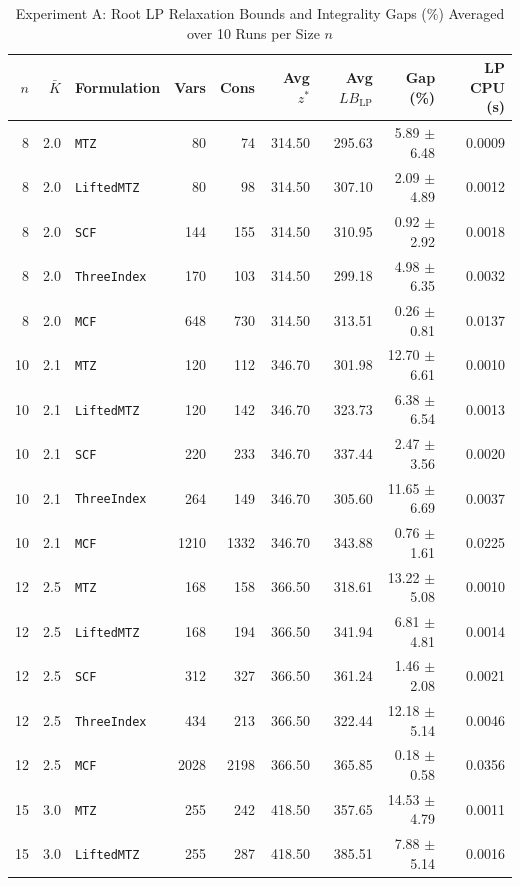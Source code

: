 \documentclass[11pt,a4paper]{article}
\begin{document}
\begin{table}[htbp]
\centering
\caption{Experiment A: Root LP Relaxation Bounds and Integrality Gaps (\%) Averaged over 10 Runs per Size $n$}
\label{tab:root_lp}
\footnotesize
\begin{tabular}{rrlrrrrrr}
\toprule
$n$ & $\bar{K}$ & Formulation & Vars & Cons & Avg $z^*$ & Avg $LB_{\text{LP}}$ & Gap (\%) & LP CPU (s) \\
\midrule
8 & 2.0 & \texttt{MTZ} & 80 & 74 & 314.50 & 295.63 & 5.89 $\pm$ 6.48 & 0.0009 \\
8 & 2.0 & \texttt{LiftedMTZ} & 80 & 98 & 314.50 & 307.10 & 2.09 $\pm$ 4.89 & 0.0012 \\
8 & 2.0 & \texttt{SCF} & 144 & 155 & 314.50 & 310.95 & 0.92 $\pm$ 2.92 & 0.0018 \\
8 & 2.0 & \texttt{ThreeIndex} & 170 & 103 & 314.50 & 299.18 & 4.98 $\pm$ 6.35 & 0.0032 \\
8 & 2.0 & \texttt{MCF} & 648 & 730 & 314.50 & 313.51 & 0.26 $\pm$ 0.81 & 0.0137 \\
\midrule
10 & 2.1 & \texttt{MTZ} & 120 & 112 & 346.70 & 301.98 & 12.70 $\pm$ 6.61 & 0.0010 \\
10 & 2.1 & \texttt{LiftedMTZ} & 120 & 142 & 346.70 & 323.73 & 6.38 $\pm$ 6.54 & 0.0013 \\
10 & 2.1 & \texttt{SCF} & 220 & 233 & 346.70 & 337.44 & 2.47 $\pm$ 3.56 & 0.0020 \\
10 & 2.1 & \texttt{ThreeIndex} & 264 & 149 & 346.70 & 305.60 & 11.65 $\pm$ 6.69 & 0.0037 \\
10 & 2.1 & \texttt{MCF} & 1210 & 1332 & 346.70 & 343.88 & 0.76 $\pm$ 1.61 & 0.0225 \\
\midrule
12 & 2.5 & \texttt{MTZ} & 168 & 158 & 366.50 & 318.61 & 13.22 $\pm$ 5.08 & 0.0010 \\
12 & 2.5 & \texttt{LiftedMTZ} & 168 & 194 & 366.50 & 341.94 & 6.81 $\pm$ 4.81 & 0.0014 \\
12 & 2.5 & \texttt{SCF} & 312 & 327 & 366.50 & 361.24 & 1.46 $\pm$ 2.08 & 0.0021 \\
12 & 2.5 & \texttt{ThreeIndex} & 434 & 213 & 366.50 & 322.44 & 12.18 $\pm$ 5.14 & 0.0046 \\
12 & 2.5 & \texttt{MCF} & 2028 & 2198 & 366.50 & 365.85 & 0.18 $\pm$ 0.58 & 0.0356 \\
\midrule
15 & 3.0 & \texttt{MTZ} & 255 & 242 & 418.50 & 357.65 & 14.53 $\pm$ 4.79 & 0.0011 \\
15 & 3.0 & \texttt{LiftedMTZ} & 255 & 287 & 418.50 & 385.51 & 7.88 $\pm$ 5.14 & 0.0016 \\

\end{tabular}
\end{table}
\end{document}
